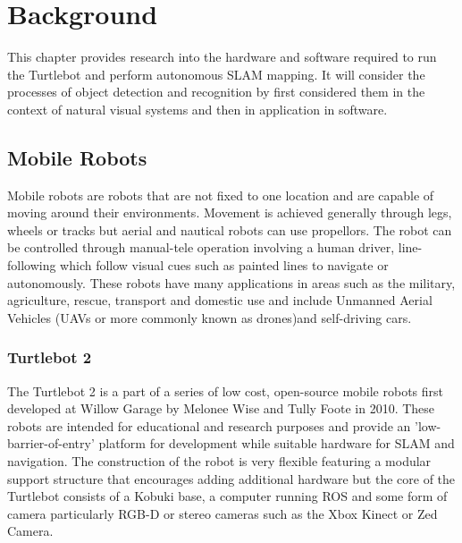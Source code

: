 \documentclass{mproj}
\begin{document}
\chapter{Background}\label{survey}

This chapter provides research into the hardware and software required to run the Turtlebot and perform autonomous SLAM mapping.
It will consider the processes of object detection and recognition by first considered them in the context of natural visual systems and then in application in software.

\section{Mobile Robots}


Mobile robots are robots that are not fixed to one location and are capable of moving around their environments. Movement is achieved generally through legs, wheels or tracks but aerial and nautical robots can use propellors. The robot can be controlled through manual-tele operation involving a human driver, line-following which follow visual cues such as painted lines to navigate or autonomously. These robots have many applications in areas such as the military, agriculture, rescue, transport and domestic use and include Unmanned Aerial Vehicles (UAVs or more commonly known as drones)and self-driving cars.

\subsection{Turtlebot 2}

The Turtlebot 2 is a part of a series of low cost, open-source mobile robots first developed at Willow Garage by Melonee Wise and Tully Foote in 2010. These robots are intended for educational and research purposes and provide an 'low-barrier-of-entry' platform for development while suitable hardware for SLAM and navigation\cite{turtlebot}. The construction of the robot is very flexible featuring a modular support structure that encourages adding additional hardware but the core of the Turtlebot consists of a Kobuki base, a computer running ROS and some form of camera particularly RGB-D or stereo cameras such as the Xbox Kinect or Zed Camera.
\end{document}
